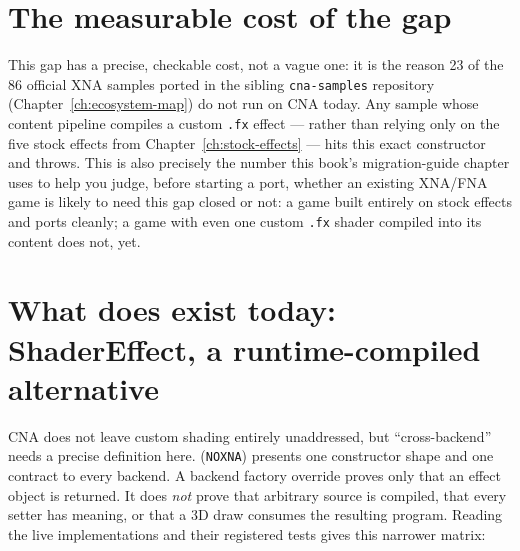 \section{The measurable cost of the gap}

This gap has a precise, checkable cost, not a vague one: it is the reason 23 of the 86
official XNA samples ported in the sibling \texttt{cna-samples} repository
(Chapter~\ref{ch:ecosystem-map}) do not run on CNA today. Any sample whose content pipeline
compiles a custom \texttt{.fx} effect --- rather than relying only on the five stock effects
from Chapter~\ref{ch:stock-effects} --- hits this exact constructor and throws. This is also
precisely the number this book's migration-guide chapter uses to help you judge, before
starting a port, whether an existing XNA/FNA game is likely to need this gap closed or not:
a game built entirely on stock effects and  ports cleanly; a game with
even one custom \texttt{.fx} shader compiled into its content does not, yet.

\section{What does exist today: ShaderEffect, a runtime-compiled alternative}

CNA does not leave custom shading entirely unaddressed, but ``cross-backend'' needs a precise
definition here.  (\texttt{NOXNA}) presents one constructor shape and
one  contract to every backend. A backend factory override proves
only that an effect object is returned. It does \emph{not} prove that arbitrary source is
compiled, that every setter has meaning, or that a 3D draw consumes the resulting program.
Reading the live implementations and their registered tests gives this narrower matrix:

